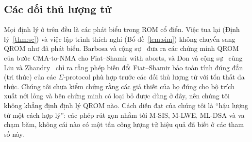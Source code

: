 \subsection{Các đối thủ lượng tử}
\label{sec:sec-qrom}

Mọi định lý ở trên đều là các phát biểu trong ROM cổ điển. Việc tua lại
(Định lý~\ref{thm:se}) và việc lập trình thích nghi (Bổ đề~\ref{lem:sim}) không
chuyển sang QROM như đã phát biểu. Barbosa và cộng sự~\cite{ref:barbosa} đưa ra
các chứng minh QROM của bước CMA-to-NMA cho Fiat--Shamir with aborts, và Don và
cộng sự~\cite{ref:dfms19} cùng Liu và Zhandry~\cite{ref:lz19} chỉ ra rằng phép
biến đổi Fiat--Shamir bảo toàn tính đúng đắn (tri thức) của các $\Sigma$-protocol
phù hợp trước các đối thủ lượng tử với tổn thất đa thức. Chúng tôi chưa kiểm
chứng rằng các giả thiết của họ đúng cho bộ trích xuất nới lỏng và bên chứng
minh có loại bỏ được dùng ở đây, nên chúng tôi không khẳng định định lý QROM
nào. Cách diễn đạt của chúng tôi là ``hậu lượng tử một cách hợp lý'': các phép
rút gọn nhắm tới M-SIS, M-LWE, ML-DSA và va chạm băm, không cái nào có một tấn
công lượng tử hiệu quả đã biết ở các tham số này.
